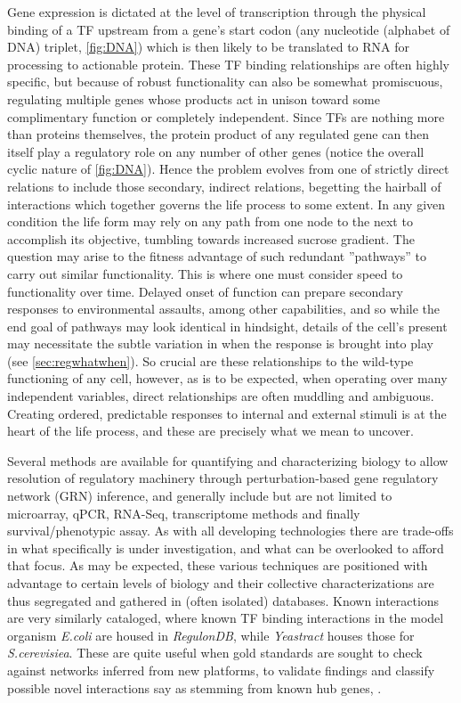 Gene expression is dictated at the level of transcription through the physical binding of a TF upstream from a gene's start codon (any nucleotide (alphabet of DNA) triplet, \cref{fig:DNA}) which is then likely to be translated to RNA for processing to actionable protein. These TF binding relationships are often highly specific, but because of robust functionality can also be somewhat promiscuous, regulating multiple genes whose products act in unison toward some complimentary function or completely independent. Since TFs are nothing more than proteins themselves, the protein product of any regulated gene can then itself play a regulatory role on any number of other genes (notice the overall cyclic nature of \cref{fig:DNA}). Hence the problem evolves from one of strictly direct relations to include those secondary, \etc indirect relations, begetting the hairball of interactions which together governs the life process to some extent. In any given condition the life form may rely on any path from one node to the next to accomplish its objective, \eg tumbling towards increased sucrose gradient. The question may arise to the fitness advantage of such redundant ''pathways'' to carry out similar functionality. This is where one must consider speed to functionality over time. Delayed onset of function can prepare secondary responses to environmental assaults, among other capabilities, and so while the end goal of pathways may look identical in hindsight, details of the cell's present may necessitate the subtle variation in when the response is brought into play (see \cref{sec:regwhatwhen}). So crucial are these relationships to the wild-type functioning of any cell, however, as is to be expected, when operating over many independent variables, direct relationships are often muddling and ambiguous. Creating ordered, predictable responses to internal and external stimuli is at the heart of the life process, and these are precisely what we mean to uncover.

Several methods are available for quantifying and characterizing biology to allow resolution of regulatory machinery through perturbation-based gene regulatory network (GRN) inference, and generally include but are not limited to microarray, qPCR, RNA-Seq, transcriptome methods and finally survival/phenotypic assay. As with all developing technologies there are trade-offs in what specifically is under investigation, and what can be overlooked to afford that focus. As may be expected, these various techniques are positioned with advantage to certain levels of biology and their collective characterizations are thus segregated and gathered in (often isolated) databases. Known interactions are very similarly cataloged, where known TF binding interactions in the model organism \emph{E.coli} are housed in \emph{RegulonDB}\cite{gama2008regulondb}, while \emph{Yeastract}\cite{teixeira2006yeastract} houses those for \emph{S.cerevisiea}. These are quite useful when gold standards are sought to check against networks inferred from new platforms, to validate findings and classify possible novel interactions \eg say as stemming from known hub genes, \etc.

